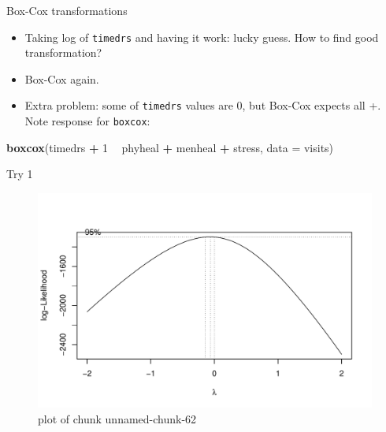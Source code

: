 \documentclass[ignorenonframetext,]{beamer}
\newenvironment{Shaded}{\begin{snugshade}}{\end{snugshade}}
\newcommand{\DataTypeTok}[1]{\textcolor[rgb]{0.13,0.29,0.53}{#1}}
\newcommand{\DecValTok}[1]{\textcolor[rgb]{0.00,0.00,0.81}{#1}}
\newcommand{\KeywordTok}[1]{\textcolor[rgb]{0.13,0.29,0.53}{\textbf{#1}}}
\newcommand{\NormalTok}[1]{#1}
\newcommand{\OperatorTok}[1]{\textcolor[rgb]{0.81,0.36,0.00}{\textbf{#1}}}
\newcommand{\StringTok}[1]{\textcolor[rgb]{0.31,0.60,0.02}{#1}}
\begin{document}
\begin{frame}[fragile]{Box-Cox transformations}
\protect\hypertarget{box-cox-transformations}{}

\begin{itemize}
\item
  Taking log of \texttt{timedrs} and having it work: lucky guess. How to
  find good transformation?
\item
  Box-Cox again.
\item
  Extra problem: some of \texttt{timedrs} values are 0, but Box-Cox
  expects all +. Note response for \texttt{boxcox}:
\end{itemize}

\begin{Shaded}
\begin{Highlighting}[]
\KeywordTok{boxcox}\NormalTok{(timedrs }\OperatorTok{+}\StringTok{ }\DecValTok{1} \OperatorTok{~}\StringTok{ }\NormalTok{phyheal }\OperatorTok{+}\StringTok{ }\NormalTok{menheal }\OperatorTok{+}\StringTok{ }\NormalTok{stress, }\DataTypeTok{data =}\NormalTok{ visits)}
\end{Highlighting}
\end{Shaded}

\end{frame}

\begin{frame}{Try 1}
\protect\hypertarget{try-1}{}

\begin{figure}
\centering
\includegraphics{figure/unnamed-chunk-62-1.pdf}
\caption{plot of chunk unnamed-chunk-62}
\end{figure}

\end{frame}
\end{document}
